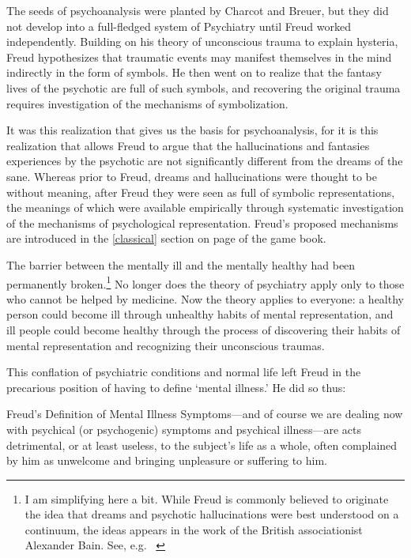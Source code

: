 \begin{refsection}
The seeds of psychoanalysis were planted by Charcot and Breuer, but they did not develop into a full-fledged system of Psychiatry until Freud worked independently. Building on his theory of unconscious trauma to explain hysteria, Freud hypothesizes that traumatic events may manifest themselves in the mind indirectly in the form of symbols. He then went on to realize that the fantasy lives of the psychotic are full of such symbols, and recovering the original trauma requires investigation of the mechanisms of symbolization.

It was this realization that gives us the basis for psychoanalysis, for it is this realization that allows Freud to argue that the hallucinations and fantasies experiences by the psychotic are not significantly different from the dreams of the sane. Whereas prior to Freud, dreams and hallucinations were thought to be without meaning, after Freud they were seen as full of symbolic representations, the meanings of which were available empirically through systematic investigation of the mechanisms of psychological representation. Freud's proposed mechanisms are introduced in the \ref{classical} section on page \pageref{classical} of the game book.

The barrier between the mentally ill and the mentally healthy had been permanently broken.\footnote{I am simplifying here a bit. While Freud is commonly believed to originate the idea that dreams and psychotic hallucinations were best understood on a continuum, the ideas appears in the work of the British associationist Alexander Bain. See, e.g. ~\citep[p. 45]{Bain:1903tf}} No longer does the theory of psychiatry apply only to those who cannot be helped by medicine. Now the theory applies to everyone: a healthy person could become ill through unhealthy habits of mental representation, and ill people could become healthy through the process of discovering their habits of mental representation and recognizing their unconscious traumas. 

This conflation of psychiatric conditions and normal life left Freud in the precarious position of having to define `mental illness.' He did so thus:
\begin{apatextbox}{Freud’s Definition of Mental Illness} Symptoms—and of course we are dealing now with psychical (or psychogenic) symptoms and psychical illness—are acts detrimental, or at least useless, to the subject's life as a whole, often complained by him as unwelcome and bringing unpleasure or suffering to him. ~\citep[p. 445]{Freud:QdOvAgyZ}


\end{apatextbox}
\end{refsection}
